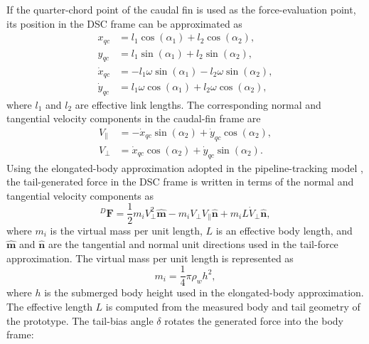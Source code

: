 \documentclass{uhcoethesis}
\begin{document}
If the quarter-chord point of the caudal fin is used as the force-evaluation point, its position in the DSC frame can be approximated as
\begin{equation}
    \begin{aligned}
        x_{qc} &= l_1\cos(\alpha_1) + l_2\cos(\alpha_2), \\
        y_{qc} &= l_1\sin(\alpha_1) + l_2\sin(\alpha_2), \\
        \dot{x}_{qc} &= -l_1\omega\sin(\alpha_1)-l_2\omega\sin(\alpha_2), \\
        \dot{y}_{qc} &= l_1\omega\cos(\alpha_1)+l_2\omega\cos(\alpha_2),
    \end{aligned}
    \label{eq:ch2_qc_position}
\end{equation}
where $l_1$ and $l_2$ are effective link lengths. The corresponding normal and tangential velocity components in the caudal-fin frame are
\begin{equation}
    \begin{aligned}
        V_{\parallel} &=
        -\dot{x}_{qc}\sin(\alpha_2) + \dot{y}_{qc}\cos(\alpha_2), \\
        V_{\perp} &=
        \dot{x}_{qc}\cos(\alpha_2) + \dot{y}_{qc}\sin(\alpha_2).
    \end{aligned}
    \label{eq:ch2_cf_velocity}
\end{equation}
Using the elongated-body approximation adopted in the pipeline-tracking model \cite{Wang2013,Lighthill1971,Masood2025Pipeline}, the tail-generated force in the DSC frame is written in terms of the normal and tangential velocity components as
\begin{equation}
    {}^{D}\mathbf{F}
    =
    \frac{1}{2}m_i V_{\perp}^{2}\hat{\mathbf{m}}
    - m_i V_{\perp}V_{\parallel}\hat{\mathbf{n}}
    + m_i L\dot{V}_{\perp}\hat{\mathbf{n}},
    \label{eq:ch2_tail_force_d}
\end{equation}
where $m_i$ is the virtual mass per unit length, $L$ is an effective body length, and $\hat{\mathbf{m}}$ and $\hat{\mathbf{n}}$ are the tangential and normal unit directions used in the tail-force approximation. The virtual mass per unit length is represented as
\begin{equation}
    m_i = \frac{1}{4}\pi\rho_w h^2 ,
    \label{eq:ch2_virtual_mass}
\end{equation}
where $h$ is the submerged body height used in the elongated-body approximation. The effective length $L$ is computed from the measured body and tail geometry of the prototype. The tail-bias angle $\delta$ rotates the generated force into the body frame:
\end{document}
